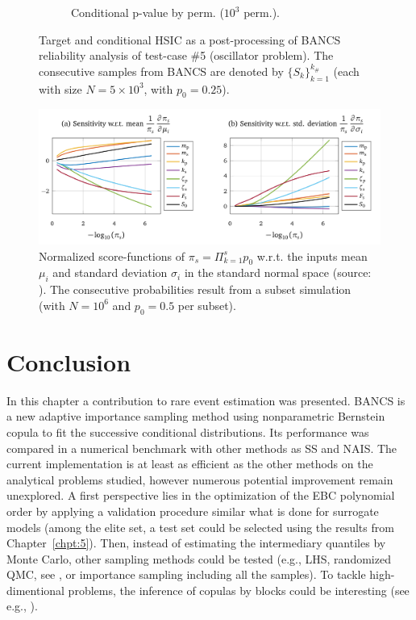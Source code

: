 \begin{figure}
\begin{subfigure}[b]{0.48\linewidth}
        \caption{Conditional p-value by perm. ($10^3$ perm.).}
    \end{subfigure}
    \caption{Target and conditional HSIC as a post-processing of BANCS reliability analysis of test-case \#5 (oscillator problem). 
    The consecutive samples from BANCS are denoted by $\{S_k\}_{k=1}^{k_\#}$ (each with size $N=5\times10^3$, with $p_0=0.25$).}
    \label{fig:rosa_oscillator}
\end{figure}


\begin{figure}
    \centering
    \includegraphics[width=0.9\linewidth]{part3/figures/BANCS/score_function_HDR_JMB.png}
    \caption{Normalized score-functions of $\pi_s = \Pi_{k=1}^s p_0$ w.r.t. the inputs mean $\mu_i$ and standard deviation $\sigma_i$ in the standard normal space (source: \citealp[p.54]{bourinet_2018}). 
            The consecutive probabilities result from a subset simulation (with $N=10^6$ and $p_0=0.5$ per subset).}
    \label{fig:score_functions_oscillator}
\end{figure}



\section{Conclusion}

In this chapter a contribution to rare event estimation was presented. 
BANCS is a new adaptive importance sampling method using nonparametric Bernstein copula to fit the successive conditional distributions. 
Its performance was compared in a numerical benchmark with other methods as SS and NAIS. 
The current implementation is at least as efficient as the other methods on the analytical problems studied, however numerous potential improvement remain unexplored. 
A first perspective lies in the optimization of the EBC polynomial order by applying a validation procedure similar what is done for surrogate models (among the elite set, a test set could be selected using the results from Chapter~\ref{chpt:5}). 
Then, instead of estimating the intermediary quantiles by Monte Carlo, other sampling methods could be tested (e.g., LHS, randomized QMC, see \citealp{tuffin_2019}, or importance sampling including all the samples). 
To tackle high-dimentional problems, the inference of copulas by blocks could be interesting (see e.g., \citealp{lasserre_2022}).

